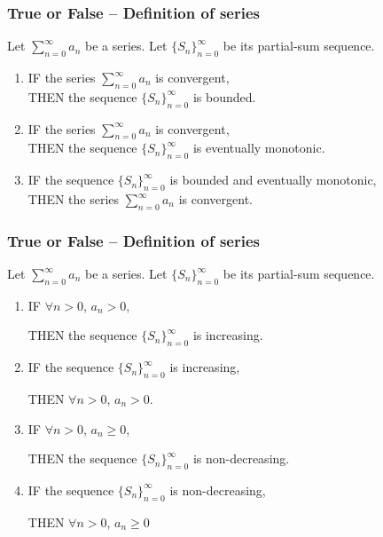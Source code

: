 \documentclass[14pt]{beamer}
\newcommand {\DS} [1] {${\displaystyle #1}$}
\newcommand{\azul}[1]{{\color{blue} #1}}
\newcommand{\rojo}[1]{{\color{red} #1}}
\newcommand{\setsize}[1]{\fontsize{#1}{#1}\selectfont} %
\newcommand{\vv}{\vspace{.5cm}}
\newcommand{\vvv}{\vspace{.2cm}}
\begin{document}
\begin{frame}[t]
\setsize{12}
\frametitle{True or False -- Definition of series}

Let \DS{\sum_{n=0}^{\infty} a_n} be a series.  
Let \DS{\{ S_n \}_{n=0}^{\infty}} be its partial-sum sequence.

\begin{enumerate}
	\item IF \azul{the series \DS{\sum_{n=0}^{\infty} a_n}  is convergent}, \\
 	THEN \rojo{the sequence  \DS{\{ S_n \}_{n=0}^{\infty}} is bounded}.
\vspace{.5cm}

	\item IF \azul{the series \DS{\sum_{n=0}^{\infty} a_n}  is convergent}, \\
 	THEN \rojo{the sequence  \DS{\{ S_n \}_{n=0}^{\infty}} is eventually monotonic}.
\vspace{.8cm}

	\item IF \rojo{the sequence \DS{\{ S_n \}_{n=0}^{\infty}} is bounded and eventually monotonic}, \\
	THEN \azul{the series \DS{\sum_{n=0}^{\infty} a_n}  is convergent}.
\end{enumerate}

\end{frame}
\begin{frame}[t]
\setsize{12}
\frametitle{True or False -- Definition of series}

Let \DS{\sum_{n=0}^{\infty} a_n} be a series.  
Let \DS{\{ S_n \}_{n=0}^{\infty}} be its partial-sum sequence.

\begin{enumerate}
\addtocounter{enumi}{3}
	\item IF \azul{\DS{\forall n >0}, \DS{a_n>0}}, 
	\vvv
	
	THEN \rojo{the sequence \DS{\{ S_n \}_{n=0}^{\infty}} is increasing}.
\vv

	\item IF \rojo{the sequence \DS{\{ S_n \}_{n=0}^{\infty}} is increasing}, \\
	\vvv 
	
	THEN \azul{\DS{\forall n >0}, \DS{a_n>0}}.
\vv

	\item IF \azul{\DS{\forall n >0}, \DS{a_n\geq0}}, 
	\vvv
	
	THEN \rojo{the sequence \DS{\{ S_n \}_{n=0}^{\infty}} is non-decreasing}.

\vv
	\item IF \rojo{the sequence \DS{\{ S_n \}_{n=0}^{\infty}} is non-decreasing}, \\
	\vvv 
	
	THEN \azul{\DS{\forall n >0}, \DS{a_n\geq0}}
\end{enumerate}

\end{frame}
\end{document}
